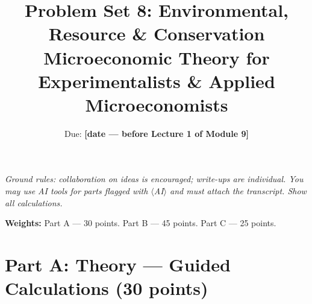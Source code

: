 \documentclass[11pt]{article}
\title{Problem Set 8: Environmental, Resource \& Conservation\\
\large Microeconomic Theory for Experimentalists \& Applied Microeconomists}
\author{Due: \textbf{[date --- before Lecture 1 of Module 9]}}
\date{}
\begin{document}
\maketitle

\noindent\emph{Ground rules: collaboration on ideas is encouraged; write-ups
are individual. You may use AI tools for parts flagged with
$\langle$AI$\rangle$ and must attach the transcript. Show all calculations.}

\medskip

\noindent\textbf{Weights:} Part A --- 30 points. Part B --- 45 points.
Part C --- 25 points.

\bigskip

\section*{Part A: Theory --- Guided Calculations (30 points)}
\end{document}
